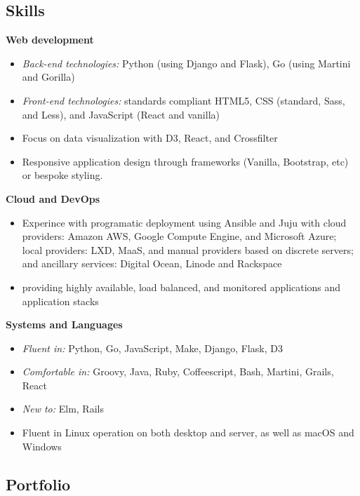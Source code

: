 \subsection{Skills}

\textbf{Web development}

\begin{itemize}
    \item \textit{Back-end technologies:} Python (using Django and Flask), Go (using Martini and Gorilla)
    \item \textit{Front-end technologies:} standards compliant HTML5, CSS (standard, Sass, and Less), and JavaScript (React and vanilla)
    \item Focus on data visualization with D3, React, and Crossfilter
    \item Responsive application design through frameworks (Vanilla, Bootstrap, etc) or bespoke styling.
\end{itemize}

\hspace{-1.5em}\textbf{Cloud and DevOps}

\begin{itemize}
    \item Experince with programatic deployment using Ansible and Juju with cloud providers: Amazon AWS, Google Compute Engine, and Microsoft Azure; local providers: LXD, MaaS, and manual providers based on discrete servers; and ancillary services: Digital Ocean, Linode and Rackspace
    \item providing highly available, load balanced, and monitored applications and application stacks
\end{itemize}

\hspace{-1.5em}\textbf{Systems and Languages}

\begin{itemize}
    \item \textit{Fluent in:} Python, Go, JavaScript, Make, Django, Flask, D3
    \item \textit{Comfortable in:} Groovy, Java, Ruby, Coffeescript, Bash, Martini, Grails, React
    \item \textit{New to:} Elm, Rails
    \item Fluent in Linux operation on both desktop and server, as well as macOS and Windows
\end{itemize}

\subsection{Portfolio}

